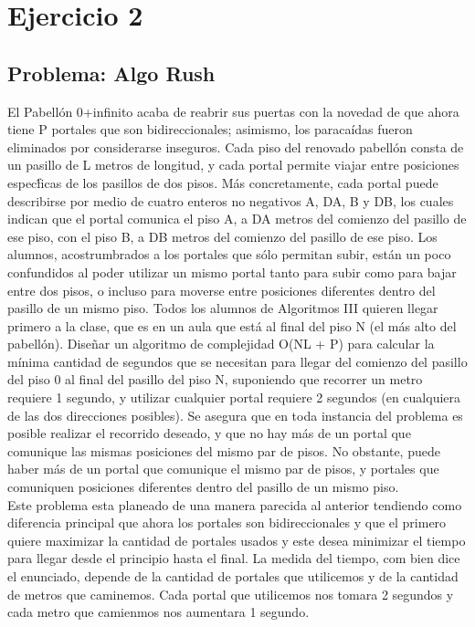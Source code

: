 
\section{Ejercicio 2}

\subsection{Problema: Algo Rush}
El Pabell\'on 0+infinito acaba de reabrir sus puertas con la novedad de que ahora tiene P portales que
son bidireccionales; asimismo, los paraca\'idas fueron eliminados por considerarse inseguros. Cada piso del renovado pabell\'on consta de un pasillo de L metros de longitud, y cada portal permite viajar entre
posiciones espec\'ficas de los pasillos de dos pisos. M\'as concretamente, cada portal puede describirse por
medio de cuatro enteros no negativos A, DA, B y DB, los cuales indican que el portal comunica el
piso A, a DA metros del comienzo del pasillo de ese piso, con el piso B, a DB metros del comienzo
del pasillo de ese piso. Los alumnos, acostrumbrados a los portales que s\'olo permitan subir, est\'an un
poco confundidos al poder utilizar un mismo portal tanto para subir como para bajar entre dos pisos, o
incluso para moverse entre posiciones diferentes dentro del pasillo de un mismo piso. Todos los alumnos
de Algoritmos III quieren llegar primero a la clase, que es en un aula que est\'a al final del piso N (el m\'as
alto del pabell\'on). Dise\~nar un algoritmo de complejidad O(NL + P) para calcular la m\'inima cantidad
de segundos que se necesitan para llegar del comienzo del pasillo del piso 0 al final del pasillo del piso
N, suponiendo que recorrer un metro requiere 1 segundo, y utilizar cualquier portal requiere 2 segundos
(en cualquiera de las dos direcciones posibles). Se asegura que en toda instancia del problema es posible
realizar el recorrido deseado, y que no hay m\'as de un portal que comunique las mismas posiciones del
mismo par de pisos. No obstante, puede haber m\'as de un portal que comunique el mismo par de pisos,
y portales que comuniquen posiciones diferentes dentro del pasillo de un mismo piso.\\

Este problema esta planeado de una manera parecida al anterior tendiendo como diferencia principal que ahora los portales son bidireccionales y que el primero quiere maximizar la cantidad de portales usados y este desea minimizar el tiempo para llegar desde el principio hasta el final. La medida del tiempo, com bien dice el enunciado, depende de la cantidad de portales que utilicemos y de la cantidad de metros que caminemos. Cada portal que utilicemos nos tomara 2 segundos y cada metro que camienmos nos aumentara 1 segundo.


